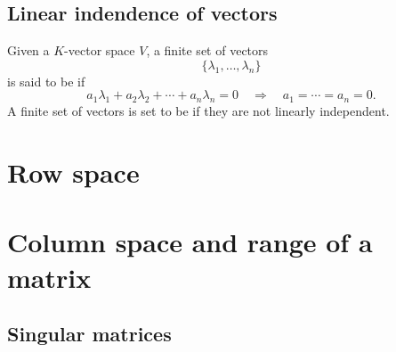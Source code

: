 \documentclass{ximera}
\begin{document}
\subsection{Linear indendence of vectors}


\begin{definition}
  Given a $K$-vector space $V$, a finite set of vectors
  \[
  \{\lambda_1,\dots,\lambda_n\}
  \]
  is said to be  if
  \[
  a_1\lambda_1 + a_2\lambda_2 +\cdots + a_n\lambda_n = 0\quad \Rightarrow \quad a_1= \cdots =a_n = 0.
  \]
  A finite set of vectors is set to be  if
  they are not linearly independent.
\end{definition}



\section{Row space}

\section{Column space and range of a matrix}

\subsection{Singular matrices}
\end{document}
